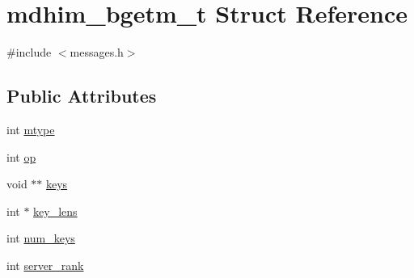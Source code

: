 \hypertarget{structmdhim__bgetm__t}{\section{mdhim\-\_\-bgetm\-\_\-t Struct Reference}
\label{d5/def/structmdhim__bgetm__t}
}


{\ttfamily \#include $<$messages.\-h$>$}

\subsection*{Public Attributes}
\begin{DoxyCompactItemize}
\item 
int \hyperlink{structmdhim__bgetm__t_aa52b25716fcf7fdc26af4dd48056d976}{mtype}
\item 
int \hyperlink{structmdhim__bgetm__t_aa4e54e836da625bad6ebc439c5f9e047}{op}
\item 
void $\ast$$\ast$ \hyperlink{structmdhim__bgetm__t_a6abc6929954a3e7aab4b71f12b9db668}{keys}
\item 
int $\ast$ \hyperlink{structmdhim__bgetm__t_a1bda084b30e5429093159a78827efb52}{key\-\_\-lens}
\item 
int \hyperlink{structmdhim__bgetm__t_aa065cf914ef318fefe986048cc5347ca}{num\-\_\-keys}
\item 
int \hyperlink{structmdhim__bgetm__t_a33b8bbb7a13cf0773954c22b18cac4f4}{server\-\_\-rank}
\end{DoxyCompactItemize}



